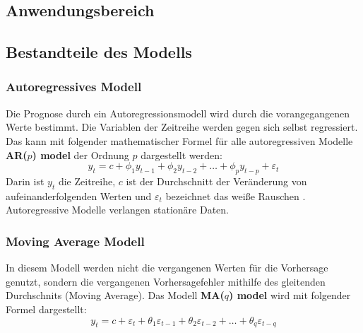 \documentclass[12pt]{report}
\begin{document}
	\subsection{Anwendungsbereich}
	
	\subsection{Bestandteile des Modells}
	\subsubsection{Autoregressives Modell}
	Die Prognose durch ein Autoregressionsmodell wird durch die vorangegangenen Werte bestimmt. Die Variablen der Zeitreihe werden gegen sich selbst regressiert. Das kann mit folgender mathematischer Formel für alle autoregressiven Modelle \textbf{AR($p$) model} der Ordnung $p$ dargestellt werden:\\
	\begin{equation}
	y_{t} = c + \phi_{1}y_{t-1} + \phi_{2}y_{t-2} + \dots + \phi_{p}y_{t-p} + \varepsilon_{t}
	\end{equation} 
	Darin ist $y_{t}$ die Zeitreihe, $c$ ist der Durchschnitt der Veränderung von aufeinanderfolgenden Werten und $\varepsilon_{t}$ bezeichnet das weiße Rauschen \cite[Kapitel 8.1, 8.3]{Hyndman.May2018}.\\
	Autoregressive Modelle verlangen stationäre Daten. 
	\subsubsection{Moving Average Modell}
	In diesem Modell werden nicht die vergangenen Werten für die Vorhersage genutzt, sondern die vergangenen Vorhersagefehler mithilfe des gleitenden Durchschnits (Moving Average)\cite[Kapitel 8.4]{Hyndman.May2018}. Das Modell \textbf{MA($q$) model} wird mit folgender Formel dargestellt:\\
	\begin{equation}
		y_{t} = c + \varepsilon_t + \theta_{1}\varepsilon_{t-1} + \theta_{2}\varepsilon_{t-2} + \dots + \theta_{q}\varepsilon_{t-q}
	\end{equation}
\end{document}
